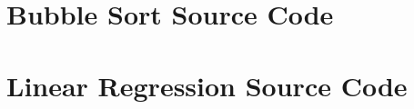 \documentclass[10pt, twocolumn]{report}
\begin{document}
\begin{appendices}
	\chapter{Bubble Sort Source Code}
	
	
	

	\chapter{Linear Regression Source Code}
	
	
	
\end{appendices}
\end{document}
